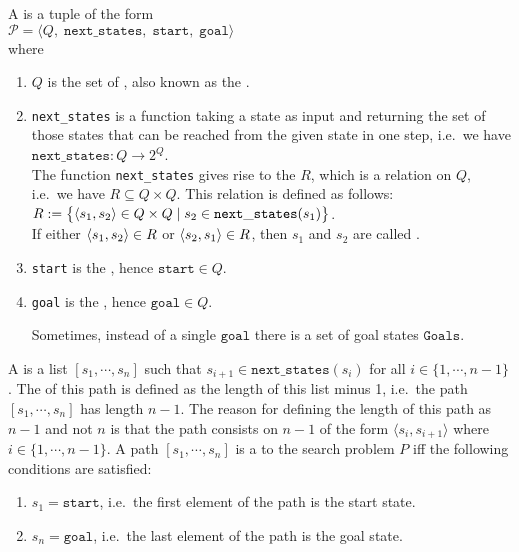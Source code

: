 \begin{Definition}
  A   is a tuple of the form
  \\[0.2cm]
  \hspace*{1.3cm}
  $\mathcal{P} = \langle Q,\;\mathtt{next\_states},\; \mathtt{start},\; \mathtt{goal}\rangle$
  \\[0.2cm]
  where
  \begin{enumerate}
  \item $Q$ is the set of , also known as the .
  \item \texttt{next\_states} is a function taking a state as input and returning the set of those
        states that can be reached from the given state in one step,
        i.e.~we have
        \\[0.2cm]
        \hspace*{1.3cm}
        $\texttt{next\_states}:Q \rightarrow 2^Q$.
        \\[0.2cm]
        The function \texttt{next\_states} gives rise to the  $R$, which is a
        relation on $Q$, i.e.~we have $R \subseteq Q \times Q$.  This relation is defined as follows:
        \\[0.2cm]
        \hspace*{1.3cm}
        $R := \bigl\{ \pair(s_1, s_2) \in Q \times Q \mid s_2 \in \mathtt{next\_states}(s_1) \bigr\}$.
        \\[0.2cm]
        If either $\pair(s_1, s_2) \in R$ or $\pair(s_2, s_1) \in R$, then  $s_1$ and $s_2$ are
        called .
  \item \texttt{start} is the , hence $\mathtt{start} \in Q$.
  \item \texttt{goal} is the , hence $\mathtt{goal} \in Q$.
    
        Sometimes, instead of a single $\texttt{goal}$ there is a set of goal states $\texttt{Goals}$.
  \end{enumerate}
  A   is a list $[s_1, \cdots, s_n]$ such that $s_{i+1} \in \mathtt{next\_states}(s_i)$ for all $i \in
  \{1,\cdots,n-1\}$.
  The  of this path is defined as the length of this list minus 1, i.e.~the path  
  $[s_1, \cdots, s_n]$ has length $n-1$.  The reason for defining the length of this path as $n-1$ and not $n$ 
  is that the path consists on $n-1$   of the form $\langle s_i, s_{i+1} \rangle$ where
  $i \in \{1, \cdots, n-1\}$.
  A path $[s_1, \cdots, s_n]$ is a  
  to the search problem $P$ iff 
  the following conditions are satisfied:
  \begin{enumerate}
  \item $s_1 = \mathtt{start}$, i.e.~the first element of the path is the start state.
  \item $s_n = \mathtt{goal}$, i.e.~the last element of the path is the goal state.


\end{enumerate}
\end{Definition}
